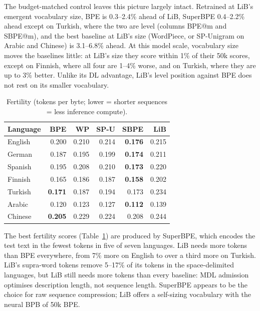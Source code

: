 \documentclass[pdflatex,sn-apa]{sn-jnl}
\begin{document}
The budget-matched control leaves this picture largely intact. Retrained at
LiB's emergent vocabulary size, BPE is 0.3--2.4\% ahead of LiB, SuperBPE
0.4--2.2\% ahead except on Turkish, where the two are level (columns BPE@m
and SBPE@m), and the best baseline at LiB's size (WordPiece, or SP-Unigram
on Arabic and Chinese) is 3.1--6.8\% ahead. At this model scale, vocabulary
size moves the baselines little: at LiB's size they score within 1\% of
their 50k scores, except on Finnish, where all four are 1--4\% worse, and
on Turkish, where they are up to 3\% better. Unlike its DL advantage, LiB's
level position against BPE does not rest on its smaller vocabulary.

\begin{table}[t]
\centering
\small
\begin{tabular}{lrrrrr}
\toprule
\textbf{Language} & \textbf{BPE} & \textbf{WP} & \textbf{SP-U} & \textbf{SBPE}
& \textbf{LiB} \\
\midrule
English  & 0.200 & 0.210 & 0.214 & \textbf{0.176} & 0.215 \\
German   & 0.187 & 0.195 & 0.199 & \textbf{0.174} & 0.211 \\
Spanish  & 0.195 & 0.208 & 0.210 & \textbf{0.173} & 0.220 \\
Finnish  & 0.165 & 0.186 & 0.187 & \textbf{0.158} & 0.202 \\
Turkish  & \textbf{0.171} & 0.187 & 0.194 & 0.173 & 0.234 \\
Arabic   & 0.120 & 0.123 & 0.127 & \textbf{0.112} & 0.139 \\
Chinese  & \textbf{0.205} & 0.229 & 0.224 & 0.208 & 0.244 \\
\bottomrule
\end{tabular}
\caption{Fertility (tokens per byte; lower = shorter sequences = less
inference compute).}
\label{tab:fertility}
\end{table}

The best fertility scores (Table~\ref{tab:fertility}) are produced by SuperBPE, which encodes the
test text in the fewest tokens in five of seven languages. LiB needs more
tokens than BPE everywhere, from 7\% more on English to over a third more on Turkish.
LiB's supra-word tokens remove 5--17\% of its tokens in the
space-delimited languages, but LiB still needs more tokens than every
baseline: MDL admission optimises description length, not sequence length.
SuperBPE appears to be the choice for raw sequence
compression; LiB offers a self-sizing vocabulary with the neural BPB of 50k
BPE.
\end{document}
